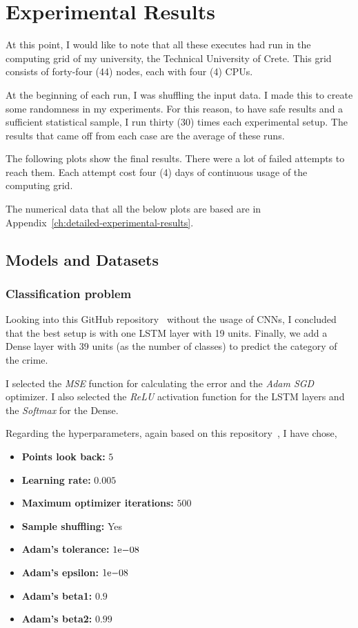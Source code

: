 \chapter{Experimental Results}\label{ch:experimental-results}

At this point, I would like to note that all these executes had run in the computing grid of my university, the Technical University of Crete.
This grid consists of forty-four (44) nodes, each with four (4) CPUs.

At the beginning of each run, I was shuffling the input data.
I made this to create some randomness in my experiments.
For this reason, to have safe results and a sufficient statistical sample, I run thirty (30) times each experimental setup.
The results that came off from each case are the average of these runs.

The following plots show the final results.
There were a lot of failed attempts to reach them.
Each attempt cost four (4) days of continuous usage of the computing grid.

The numerical data that all the below plots are based are in Appendix~\ref{ch:detailed-experimental-results}.


\section{Models and Datasets}\label{sec:models-and-datasets}

\subsection{Classification problem}\label{subsec:classification-problem}

Looking into this GitHub repository~\cite{cnn_rnn_repo} without the usage of CNNs, I concluded that the best setup is with one LSTM layer with 19 units.
Finally, we add a Dense layer with 39 units (as the number of classes) to predict the category of the crime.

I selected the \emph{MSE} function for calculating the error and the \emph{Adam SGD} optimizer.
I also selected the \emph{ReLU} activation function for the LSTM layers and the \emph{Softmax} for the Dense.

\newpage

Regarding the hyperparameters, again based on this repository~\cite{cnn_rnn_repo}, I have chose,
\begin{itemize}
    \item \textbf{Points look back:} $5$
    \item \textbf{Learning rate:} $0.005$
    \item \textbf{Maximum optimizer iterations:} $500$
    \item \textbf{Sample shuffling:} Yes
    \item \textbf{Adam's tolerance:} ${1}\mathrm{e}{-08}$
    \item \textbf{Adam's epsilon:} ${1}\mathrm{e}{-08}$
    \item \textbf{Adam's beta1:} $0.9$
    \item \textbf{Adam's beta2:} $0.99$
\end{itemize}

